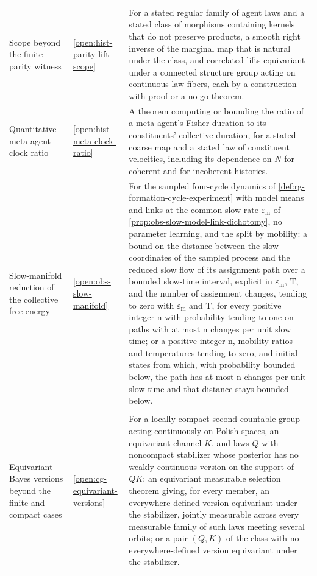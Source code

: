 {\begin{longtable}{@{}>{\raggedright\arraybackslash}p{}
>{\raggedright\arraybackslash}p{}
>{\raggedright\arraybackslash}p{}@{}}
Scope beyond the finite parity witness & \cref{open:hist-parity-lift-scope} & For a stated regular family of agent laws and a stated class of morphisms containing kernels that do not preserve products, a smooth right inverse of the marginal map that is natural under the class, and correlated lifts equivariant under a connected structure group acting on continuous law fibers, each by a construction with proof or a no-go theorem. \\
Quantitative meta-agent clock ratio & \cref{open:hist-meta-clock-ratio} & A theorem computing or bounding the ratio of a meta-agent's Fisher duration to its constituents' collective duration, for a stated coarse map and a stated law of constituent velocities, including its dependence on $N$ for coherent and for incoherent histories. \\
Slow-manifold reduction of the collective free energy & \cref{open:obs-slow-manifold} & For the sampled four-cycle dynamics of \cref{def:rg-formation-cycle-experiment} with model means and links at the common slow rate $\varepsilon_{\mathrm m}$ of \cref{prop:obs-slow-model-link-dichotomy}, no parameter learning, and the split by mobility: a bound on the distance between the slow coordinates of the sampled process and the reduced slow flow of its assignment path over a bounded slow-time interval, explicit in $\varepsilon_{\mathrm m}$, $\mathrm T$, and the number of assignment changes, tending to zero with $\varepsilon_{\mathrm m}$ and $\mathrm T$, for every positive integer $\mathrm n$ with probability tending to one on paths with at most $\mathrm n$ changes per unit slow time; or a positive integer $\mathrm n$, mobility ratios and temperatures tending to zero, and initial states from which, with probability bounded below, the path has at most $\mathrm n$ changes per unit slow time and that distance stays bounded below. \\
\multicolumn{3}{@{}l}{\textbf{Part II: exact coarse-graining at one base point}} \\
Equivariant Bayes versions beyond the finite and compact cases & \cref{open:cg-equivariant-versions} & For a locally compact second countable group acting continuously on Polish spaces, an equivariant channel $K$, and laws $Q$ with noncompact stabilizer whose posterior has no weakly continuous version on the support of $QK$: an equivariant measurable selection theorem giving, for every member, an everywhere-defined version equivariant under the stabilizer, jointly measurable across every measurable family of such laws meeting several orbits; or a pair $(Q,K)$ of the class with no everywhere-defined version equivariant under the stabilizer. \\

\end{longtable}}
